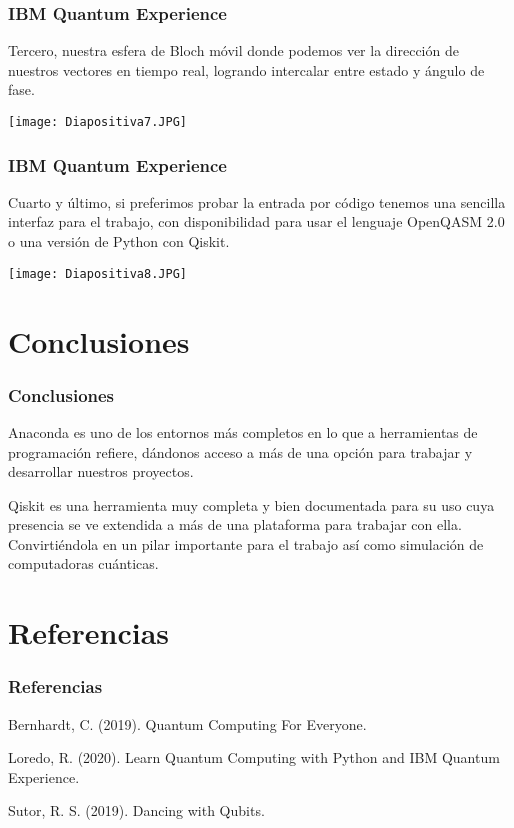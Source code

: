 \documentclass[spanish]{beamer}
\begin{document}
  \newpage\justify \begin{frame}
 \frametitle{IBM Quantum Experience} 
 Tercero, nuestra esfera de Bloch móvil donde podemos ver la dirección de nuestros vectores en tiempo real, logrando intercalar entre estado y ángulo de fase.
 
 \centering\texttt{[image: Diapositiva7.JPG]}
 \end{frame}
 
 \newpage\justify \begin{frame}
 \frametitle{IBM Quantum Experience} 
Cuarto y último, si preferimos probar la entrada por código tenemos una sencilla interfaz para el trabajo, con disponibilidad para usar el lenguaje OpenQASM 2.0 o una versión de Python con Qiskit.
 
\centering\texttt{[image: Diapositiva8.JPG]}
\end{frame}
\section{Conclusiones}\setlength{\parskip}{1mm}
\begin{frame}[fragile]\frametitle{Conclusiones}\justify 

Anaconda es uno de los entornos más completos en lo que a herramientas de programación refiere, dándonos acceso a más de una opción para trabajar y desarrollar nuestros proyectos. 

Qiskit es una herramienta muy completa y bien documentada para su uso cuya presencia se ve extendida a más de una plataforma para trabajar con ella. Convirtiéndola en un pilar importante para el trabajo así como simulación de computadoras cuánticas.

\end{frame}
\section{Referencias}\setlength{\parskip}{1mm}
\begin{frame}[fragile]\frametitle{Referencias}\justify 
Bernhardt, C. (2019). Quantum Computing For Everyone. 

Loredo, R. (2020). Learn Quantum Computing with Python and IBM Quantum Experience. 

Sutor, R. S. (2019). Dancing with Qubits. 

\end{frame}
\end{document}
